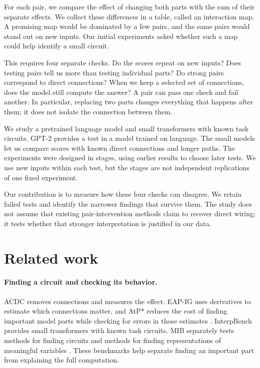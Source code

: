 \documentclass[11pt]{article}
\begin{document}
For each pair, we compare the effect of changing both parts with the sum of
their separate effects. We collect these differences in a table, called an
interaction map. A promising map would be dominated by a few pairs, and the
same pairs would stand out on new inputs. Our initial experiments asked
whether such a map could help identify a small circuit.

This requires four separate checks. Do the scores repeat on new inputs? Does
testing pairs tell us more than testing individual parts? Do strong pairs
correspond to direct connections? When we keep a selected set of connections,
does the model still compute the answer? A pair can pass one check and fail
another. In particular, replacing two parts changes everything that happens
after them; it does not isolate the connection between them.

We study a pretrained language model and small transformers with known task
circuits. GPT-2 provides a test in a model trained on language. The small
models let us compare scores with known direct connections and longer paths.
The experiments were designed in stages, using earlier results to choose later
tests. We use new inputs within each test, but the stages are not independent
replications of one fixed experiment.

Our contribution is to measure how these four checks can disagree. We retain
failed tests and identify the narrower findings that survive them. The study
does not assume that existing pair-intervention methods claim to recover direct
wiring; it tests whether that stronger interpretation is justified in our data.

\section{Related work}
\paragraph{Finding a circuit and checking its behavior.}
ACDC removes connections and measures the effect. EAP-IG uses derivatives to
estimate which connections matter, and AtP* reduces the cost of finding
important model parts while checking for errors in those estimates
\citep{conmy2023acdc,hanna2024faithfulness,kramar2024atp}. InterpBench provides
small transformers with known task circuits. MIB separately tests methods for
finding circuits and methods for finding representations of meaningful
variables \citep{gupta2024interpbench,mueller2025mib}. These benchmarks help
separate finding an important part from explaining the full computation.
\end{document}

